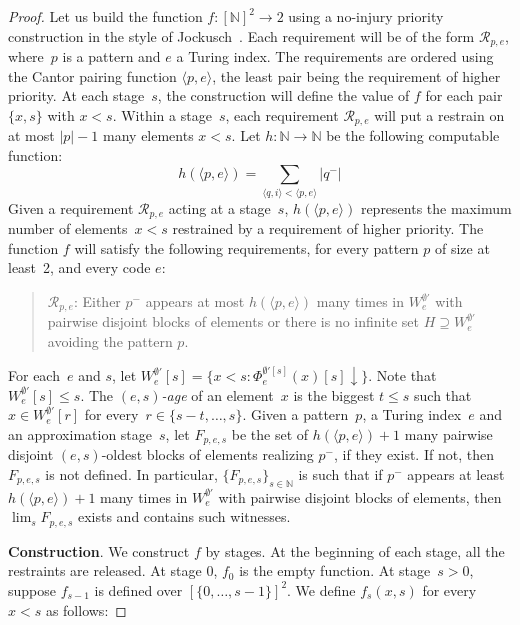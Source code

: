 \documentclass{article}
\newcommand{\NN}[0]{\mathbb{N}}
\def\NN{\mathbb{N}}
\newcommand{\R}{\mathcal{R}}
\numberwithin{theorem}{section}
\theoremstyle{definition}
\begin{document}
\begin{proof}
Let us build the function $f : [\NN]^2 \to 2$ using a no-injury priority construc\-tion in the style of Jockusch~\cite[Theorem 3.1]{jockusch1972ramsey}.
Each requirement will be of the form $\R_{p,e  }$, where~$p$ is a pattern and $e$ a Turing index. The requirements are ordered using the Cantor pairing function $\langle p, e\rangle$, the least pair being the requirement of higher priority. At each stage~$s$, the construction will define the value of $f$ for each pair $\{x, s\}$ with $x < s$. Within a stage~$s$, each requirement $\R_{p,e  }$ will put a restrain on at most $|p|-1$ many elements $x < s$. Let $h : \NN \to \NN$ be the following computable function:
$$h(\langle p,e  \rangle) = \sum_{\langle q, i\rangle < \langle p,e \rangle} |q^-|
$$
Given a requirement $\R_{p,e  }$ acting at a stage~$s$, $h(\langle p,e \rangle)$ represents the maximum number of elements~$x < s$ restrained by a requirement of higher priority.
The function $f$ will satisfy the following requirements, for every pattern $p$ of size at least~2, and every code $e$:
   \begin{quote}
        $\R_{p,e  }$: Either $p^{-}$ appears at most $h(\langle p,e \rangle)$ many times in $W^{\emptyset'}_e$ with pairwise disjoint blocks of elements or there is no infinite set $H \supseteq W^{\emptyset'}_e$ avoiding the pattern $p$.
    \end{quote}

    For each~$e$ and $s$, let $W_{e}^{\emptyset'}[s] = \{ x < s : \Phi^{\emptyset'[s]}_e(x)[s]\downarrow \}$. Note that $W_{e}^{\emptyset'}[s] \leq s$. The \emph{$(e,s)$-age} of an element~$x$ is the biggest $t \leq s$ such that $x \in W_{e}^{\emptyset'}[r]$ for every~$r \in \{s-t, \dots, s\}$. Given a pattern~$p$, a Turing index~$e$ and an approximation stage~$s$, let $F_{p, e,s}$ be the set of $h(\langle p,e \rangle)+1$ many pairwise disjoint $(e,s)$-oldest blocks of elements realizing $p^{-}$, if they exist. If not, then $F_{p, e,s}$ is not defined. 
    In particular, $\{ F_{p, e,s} \}_{s \in \NN}$ is such that if $p^{-}$ appears at least $h(\langle p,e \rangle)+1$ many times in $W_e^{\emptyset'}$ with pairwise disjoint blocks of elements, then $\lim_s F_{p, e, s}$ exists and contains such witnesses.


    \smallskip

    \textbf{Construction}.
    We construct $f$ by stages. At the beginning of each stage, all the restraints are released. At stage $0$, $f_0$ is the empty function. At stage~$s > 0$, suppose $f_{s-1}$ is defined over $[\{0,\dots, s-1\}]^2$. We define $f_{s}(x, s)$ for every $x < s$ as follows:


\end{proof}
\end{document}
